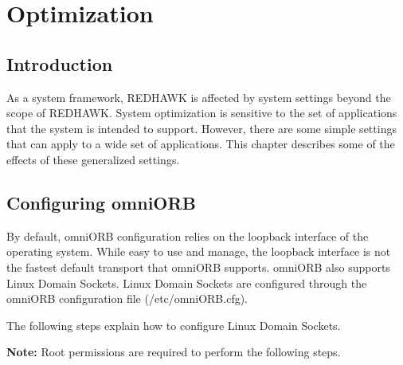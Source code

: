 \chapter{Optimization}

\label{chap:Optimization}

\section{Introduction}

As a system framework, REDHAWK is affected by system settings beyond the scope of REDHAWK. System optimization is sensitive to the set of applications that the system is intended to support. However, there are some simple settings that can apply to a wide set of applications. This chapter describes some of the effects of these generalized settings.

\section{Configuring omniORB}
\label{section:omniORBConfigurationPipes}

By default, omniORB configuration relies on the loopback interface of the operating system. While easy to use and manage, the loopback interface is not the fastest default transport that omniORB supports. omniORB also supports Linux Domain Sockets. Linux Domain Sockets are configured through the omniORB configuration file (/etc/omniORB.cfg).

The following steps explain how to configure Linux Domain Sockets.

\textbf{Note:} Root permissions are required to perform the following steps.

